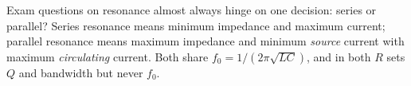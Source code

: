 \begin{exambox}
Exam questions on resonance almost always hinge on one decision: series or
parallel? Series resonance means minimum impedance and maximum current; parallel
resonance means maximum impedance and minimum \emph{source} current with maximum
\emph{circulating} current. Both share \(f_0=1/(2\pi\sqrt{LC})\), and in both
\(R\) sets \(Q\) and bandwidth but never \(f_0\).
\end{exambox}

